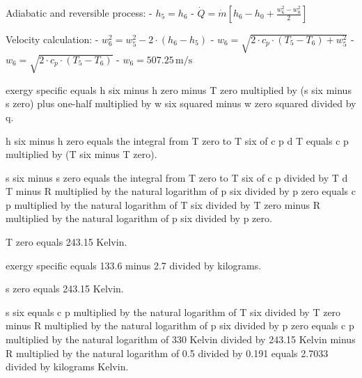 Adiabatic and reversible process:  
- \( h_5 = h_6 \)  
- \( \dot{Q} = \dot{m} \left[ h_6 - h_0 + \frac{w_6^2 - w_0^2}{2} \right] \)  

Velocity calculation:  
- \( w_6^2 = w_5^2 - 2 \cdot \left( h_6 - h_5 \right) \)  
- \( w_6 = \sqrt{2 \cdot c_p \cdot \left( T_5 - T_6 \right) + w_5^2} \)  
- \( w_6 = \sqrt{2 \cdot c_p \cdot \left( T_5 - T_6 \right)} \)  
- \( w_6 = 507.25 \, \text{m/s} \)

exergy specific equals h six minus h zero minus T zero multiplied by (s six minus s zero) plus one-half multiplied by w six squared minus w zero squared divided by q.  

h six minus h zero equals the integral from T zero to T six of c p d T equals c p multiplied by (T six minus T zero).  

s six minus s zero equals the integral from T zero to T six of c p divided by T d T minus R multiplied by the natural logarithm of p six divided by p zero equals c p multiplied by the natural logarithm of T six divided by T zero minus R multiplied by the natural logarithm of p six divided by p zero.  

T zero equals 243.15 Kelvin.  

exergy specific equals 133.6 minus 2.7 divided by kilograms.  

s zero equals 243.15 Kelvin.  

s six equals c p multiplied by the natural logarithm of T six divided by T zero minus R multiplied by the natural logarithm of p six divided by p zero equals c p multiplied by the natural logarithm of 330 Kelvin divided by 243.15 Kelvin minus R multiplied by the natural logarithm of 0.5 divided by 0.191 equals 2.7033 divided by kilograms Kelvin.